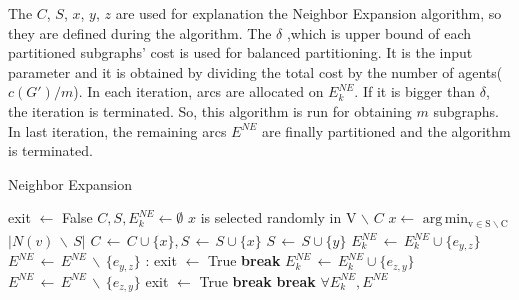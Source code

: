 \documentclass{article}
\begin{document}
The $C$, $S$, $x$, $y$, $z$ are used for explanation the Neighbor Expansion algorithm, so they are defined during the algorithm. The $\delta$ ,which is upper bound of each partitioned subgraphs' cost is used for balanced partitioning. It is the input parameter and it is obtained by dividing the total cost by the number of agents($c(G')/m$). In each iteration, arcs are allocated on $E^{NE}_k$. If it is bigger than $\delta$, the iteration is terminated. So, this algorithm is run for obtaining $m$ subgraphs. In last iteration, the remaining arcs $E^{NE}$ are finally partitioned and the algorithm is terminated.
\begin{algorithm}[H]
    \caption{Neighbor Expansion}
    \begin{algorithmic}[1]
            \State exit $\leftarrow$ False
                \State $C,S,E^{NE}_k \leftarrow \emptyset$
                         \State $x$ is selected randomly in V $\backslash$ $C$
                    \Else 
                        \State $x \leftarrow$ $\underset{}{\operatorname{arg\,min_{v\in S \backslash C}}}$ $|N(v) \, \backslash \, S|$
                    \EndIf
                    \State $C \, \leftarrow \, C \cup \{x \}, S \, \leftarrow \, S \cup \{x \}$
                        \State $S \, \leftarrow \, S \cup \{y\}$
                                \State $E^{NE}_k\, \leftarrow \, E^{NE}_k \cup \{e_{y,z}\}$
                                \State $E^{NE} \, \leftarrow \, E^{NE} \, \backslash \, \{e_{y,z}\}$
                            \EndIf
                            :
                                \State exit $\leftarrow$ True
                                \State \textbf{break}
                            \EndIf
                                \State $E^{NE}_k\, \leftarrow \, E^{NE}_k \cup \{e_{z,y}\}$
                                \State $E^{NE} \, \leftarrow \, E^{NE} \, \backslash \, \{e_{z,y}\}$
                            \EndIf
                            \:
                                \State exit $\leftarrow$ True
                                \State \textbf{break}
                            \EndIf
                        \EndFor
                            \State \textbf{break}
                        \EndIf
                    \EndFor
                \EndWhile
            \EndFor
            \State \Return $\forall E^{NE}_k, E^{NE}$
        \EndProcedure
    \end{algorithmic}
\end{algorithm}
\end{document}
